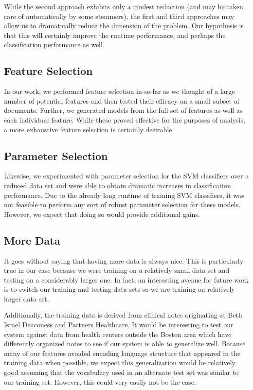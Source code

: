 \documentclass[preprint]{style}
\begin{document}
While the second approach exhibits only a modest reduction (and may be taken care of automatically by some stemmers), the first and third approaches may allow us to dramatically reduce the dimension of the problem. Our hypothesis is that this will certainly improve the runtime performance, and perhaps the classification performance as well.

\subsection{Feature Selection}
In our work, we performed feature selection in-so-far as we thought of a large number of potential features and then tested their efficacy on a small subset of documents. Further, we generated models from the full set of features as well as each individual feature. While these proved effective for the purposes of analysis, a more exhaustive feature selection is certainly desirable. 

\subsection{Parameter Selection}
Likewise, we experimented with parameter selection for the SVM classifiers over a reduced data set and were able to obtain dramatic increases in classification performance. Due to the already long runtime of training SVM classifiers, it was not feasible to perform any sort of robust parameter selection for these models. However, we expect that doing so would provide additional gains.

\subsection{More Data}

It goes without saying that having more data is always nice. This is particularly true in our case because we were training on a relatively small data set and testing on a considerably larger one. In fact, an interesting avenue for future work is to switch our training and testing data sets so we are training on relatively larger data set.

Additionally, the training data is derived from clinical notes originating at Beth Israel Deaconess and Partners Healthcare. It would be interesting to test our system against data from health centers outside the Boston area which have differently organized notes to see if our system is able to generalize well. Because many of our features avoided encoding language structure that appeared in the training data when possible, we expect this generalization would be relatively good assuming that the vocabulary used in an alternate test set was similar to our training set. However, this could very easily not be the case.
	
\end{document}
